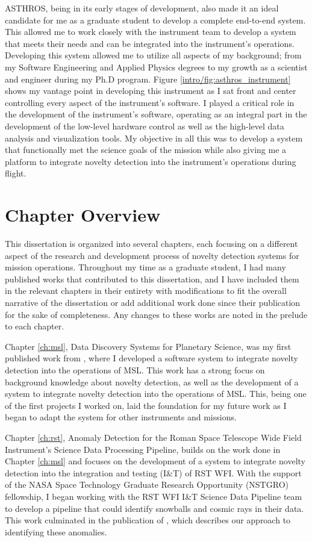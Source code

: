 ASTHROS, being in its early stages of development, also made it an ideal candidate for me as a graduate student to develop a complete end-to-end system.
This allowed me to work closely with the instrument team to develop a system that meets their needs and can be integrated into the instrument's operations.
Developing this system allowed me to utilize all aspects of my background; from my Software Engineering and Applied Physics degrees to my growth as a scientist and engineer during my Ph.D program.
Figure \ref{intro/fig:asthros_instrument} shows my vantage point in developing this instrument as I sat front and center controlling every aspect of the instrument's software. 
I played a critical role in the development of the instrument's software, operating as an integral part in the development of the low-level hardware control as well as the high-level data analysis and visualization tools.
My objective in all this was to develop a system that functionally met the science goals of the mission while also giving me a platform to integrate novelty detection into the instrument's operations during flight.

\section{Chapter Overview}
This dissertation is organized into several chapters, each focusing on a different aspect of the research and development process of novelty detection systems for mission operations.
Throughout my time as a graduate student, I had many published works that contributed to this dissertation, and I have included them in the relevant chapters in their entirety with modifications to fit the overall narrative of the dissertation or add additional work done since their publication for the sake of completeness.
Any changes to these works are noted in the prelude to each chapter.

Chapter \ref{ch:msl}, Data Discovery Systems for Planetary Science,  was my first published work from \cite{horton2021integrating}, where I developed a software system to integrate novelty detection into the operations of MSL.
This work has a strong focus on background knowledge about novelty detection, as well as the development of a system to integrate novelty detection into the operations of MSL.
This, being one of the first projects I worked on, laid the foundation for my future work as I began to adapt the system for other instruments and missions.

Chapter \ref{ch:rst}, Anomaly Detection for the Roman Space Telescope Wide Field Instrument's Science Data Processing Pipeline, builds on the work done in Chapter \ref{ch:msl} and focuses on the development of a system to integrate novelty detection into the integration and testing (I\&T) of RST WFI.
With the support of the NASA Space Technology Graduate Research Opportunity (NSTGRO) fellowship, I began working with the RST WFI I\&T Science Data Pipeline team to develop a pipeline that could identify snowballs and cosmic rays in their data. 
This work culminated in the publication of \cite{horton2024anomaly}, which describes our approach to identifying these anomalies. 

